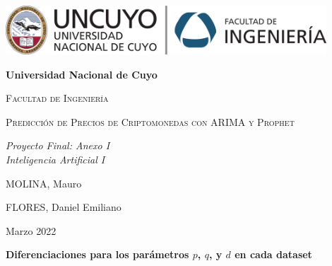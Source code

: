 \documentclass[a4paper,10pt]{article}
\begin{document}
\begin{titlepage}
\centering
{\includegraphics[width=0.9\textwidth]{fing_uncuyo}\par}
\vspace{1cm}
{\bfseries\LARGE Universidad Nacional de Cuyo \par}
\vspace{1cm}
{\scshape\Large Facultad de Ingeniería \par}
\vspace{3cm}
{\scshape\Huge Predicción de Precios de Criptomonedas con ARIMA y Prophet \par}
\vspace{3cm}
{\itshape\Large Proyecto Final: Anexo I\\Inteligencia Artificial I \par}
\vfill
{\Large MOLINA, Mauro \par}
{\Large FLORES, Daniel Emiliano \par}
\vfill
{\Large Marzo 2022 \par}
\end{titlepage}

\newpage
\textbf{\large Diferenciaciones para los parámetros $p$, $q$, y $d$ en cada dataset}
\end{document}
